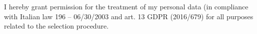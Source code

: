 \documentclass[10pt,a4paper,sans]{moderncv} %
\begin{document}
\vspace*{\fill}


    \noindent\makebox[\linewidth]{\rule{.9\paperwidth}{0.4pt}}
    {\center\footnotesize
        I hereby grant permission for the treatment of my personal data (in compliance with Italian law 196 – 06/30/2003 and art. 13 GDPR (2016/679) for all purposes related to the selection procedure.
    }

\lfoot{\today}
\thispagestyle{fancy}
\end{document}
